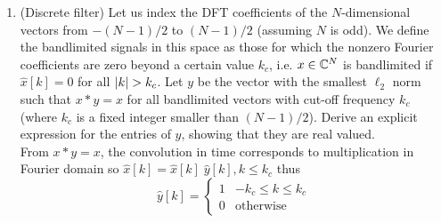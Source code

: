 \documentclass[12pt,twoside]{article}
\begin{document}
\begin{enumerate}
  \newpage
 \item (Discrete filter) Let us index the DFT coefficients of the $N$-dimensional vectors from $-(N-1)/2$ to $(N-1)/2$ (assuming $N$ is odd). We define the bandlimited signals in this space as those for which the nonzero Fourier coefficients are zero beyond a certain value $k_c$, i.e. $x \in \mathbb{C}^{N}$ is bandlimited if $\hat{x}[k]=0$ for all $\lvert k\rvert>k_c$. Let $y$ be the vector with the smallest $\ell_2$ norm such that $x \ast y = x$ for all bandlimited vectors with cut-off frequency $k_c$ (where $k_c$ is a fixed integer smaller than $(N-1)/2$). Derive an explicit expression for the entries of $y$, showing that they are real valued.\\
 
From  $x \ast y = x$, the convolution in time corresponds to multiplication in  Fourier domain so $\hat{x}[k] = \hat{x}[k] \; \hat{y}[k], k \le k_c$ thus
\begin{equation*}
  \hat{y}[k] =
    \begin{cases}
      1 & -k_c \le k \le k_c\\
      0 & \text{otherwise}
    \end{cases}       
\end{equation*}


\end{enumerate}
\end{document}
